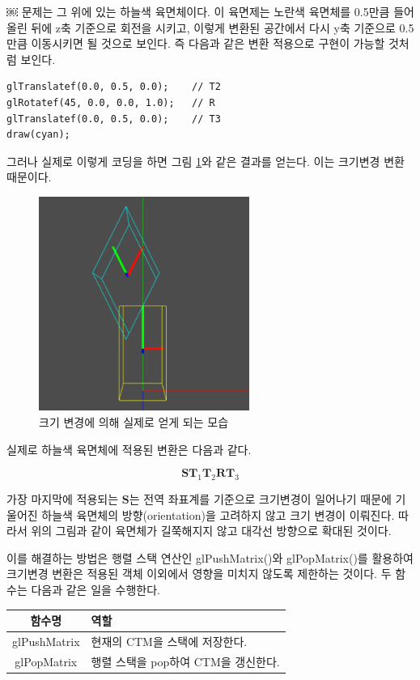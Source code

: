 ￼
문제는 그 위에 있는 하늘색 육면체이다. 이 육면제는 노란색 육면체를 0.5만큼 들어올린 뒤에 z축 기준으로 회전을 시키고, 이렇게 변환된 공간에서 다시 y축 기준으로 0.5만큼 이동시키면 될 것으로 보인다. 즉 다음과 같은 변환 적용으로 구현이 가능할 것처럼 보인다.

\begin{verbatim}
glTranslatef(0.0, 0.5, 0.0);	// T2
glRotatef(45, 0.0, 0.0, 1.0);	// R
glTranslatef(0.0, 0.5, 0.0);	// T3
draw(cyan);
\end{verbatim}

그러나 실제로 이렇게 코딩을 하면 그림 \ref{fig:OGL_transform:translateAndRotWithScale}와 같은 결과를 얻는다. 이는 크기변경 변환 때문이다. 

\begin{figure}[h!]
  \centering
    \includegraphics[height=7cm]{OGL_transform/scale.png}
    \caption{크기 변경에 의해 실제로 얻게 되는 모습}
    \label{fig:OGL_transform:translateAndRotWithScale}
\end{figure}

실제로 하늘색 육면체에 적용된 변환은 다음과 같다.

$${\mathbf S \mathbf T_1 \mathbf T_2 \mathbf R \mathbf T_3}$$

가장 마지막에 적용되는 ${\mathbf S}$는 전역 좌표계를 기준으로 크기변경이 일어나기 때문에 기울어진 하늘색 육면체의 방향(orientation)을 고려하지 않고 크기 변경이 이뤄진다. 따라서 위의 그림과 같이 육면체가 길쭉해지지 않고 대각선 방향으로 확대된 것이다.

이를 해결하는 방법은 행렬 스택 연산인 {\sf glPushMatrix()}와 {\sf glPopMatrix()}를 활용하여 크기변경 변환은 적용된 객체 이외에서 영향을 미치지 않도록 제한하는 것이다. 두 함수는 다음과 같은 일을 수행한다.

\begin{tabular}{|c|p{10cm}|}\hline
{\small \sf 함수명} & {\small \sf 역할}\\ \hline
{\small \sf glPushMatrix} & {\small \sf 현재의 CTM을 스택에 저장한다.}\\ \hline
{\small \sf glPopMatrix} & {\small \sf 행렬 스택을 pop하여 CTM을 갱신한다.}\\ \hline
\end{tabular}\\

